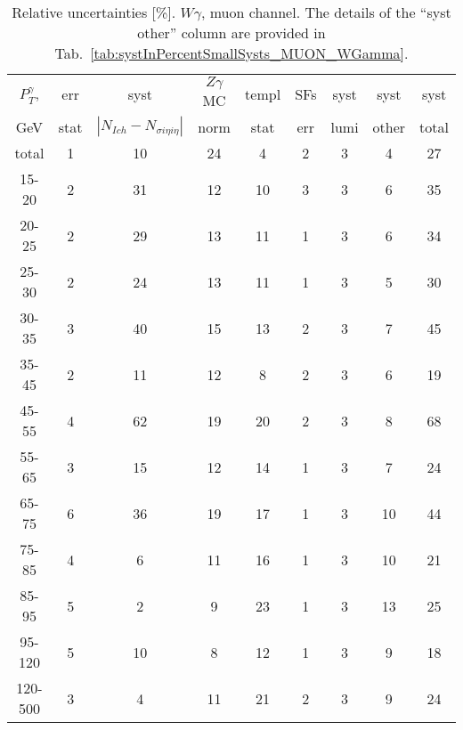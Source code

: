 \begin{table}[h]
  \scriptsize
  \begin{center}
  \caption{Relative uncertainties [\%]. $W\gamma$, muon channel. The details of the ``syst other'' column are provided in Tab.~\ref{tab:systInPercentSmallSysts_MUON_WGamma}. }
   \begin{tabular}{|c|c|c|c|c|c|c|c|c|}
    $P_T^{\gamma}$,  & err & syst                          & $Z\gamma$ MC & templ & SFs & syst & syst & syst\\
    GeV           & stat & $|N_{Ich}-N_{\sigma{i\eta i\eta}}|$ & norm         & stat  & err & lumi & other & total\\ \hline
    total  & 1 & 10 & 24 & 4 & 2 & 3 & 4 & 27 \\ \hline
    15-20 & 2 & 31 & 12 & 10 & 3 & 3 & 6 & 35 \\ \hline
    20-25 & 2 & 29 & 13 & 11 & 1 & 3 & 6 & 34 \\ \hline
    25-30 & 2 & 24 & 13 & 11 & 1 & 3 & 5 & 30 \\ \hline
    30-35 & 3 & 40 & 15 & 13 & 2 & 3 & 7 & 45 \\ \hline
    35-45 & 2 & 11 & 12 & 8 & 2 & 3 & 6 & 19 \\ \hline
    45-55 & 4 & 62 & 19 & 20 & 2 & 3 & 8 & 68 \\ \hline
    55-65 & 3 & 15 & 12 & 14 & 1 & 3 & 7 & 24 \\ \hline
    65-75 & 6 & 36 & 19 & 17 & 1 & 3 & 10 & 44 \\ \hline
    75-85 & 4 & 6 & 11 & 16 & 1 & 3 & 10 & 21 \\ \hline
    85-95 & 5 & 2 & 9 & 23 & 1 & 3 & 13 & 25 \\ \hline
    95-120 & 5 & 10 & 8 & 12 & 1 & 3 & 9 & 18 \\ \hline
    120-500 & 3 & 4 & 11 & 21 & 2 & 3 & 9 & 24 \\ \hline
  \end{tabular}
  \label{tab:systInPercent_MUON_WGamma}
  \end{center}
\end{table}


